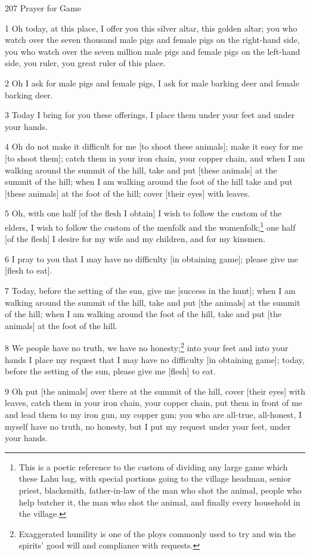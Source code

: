
207 Prayer for Game

1 Oh today, at this place, I offer you this silver altar, this golden altar; you
who watch over the seven thousand male pigs and female pigs on the right-hand side,
you who watch over the seven million male pigs and female pigs on the left-hand
side, you ruler, you great ruler of this place.

2 Oh I ask for male pigs and female pigs, I ask for male barking deer and female
barking deer.

3 Today I bring for you these offerings, I place them under your feet and under
your hands.

4 Oh do not make it difficult for me [to shoot these animals]; make it easy for
me [to shoot them]; catch them in your iron chain, your copper chain, and when
I am walking around the summit of the hill, take and put [these animals] at the
summit of the hill; when I am walking around the foot of the hill take and put
[these animals] at the foot of the hill; cover [their eyes] with leaves.

5 Oh, with one half [of the flesh I obtain] I wish to follow the custom of the
elders, I wish to follow the custom of the menfolk and the womenfolk;\footnote{This is a poetic reference to the custom of dividing any large game which these Lahu bag, with special portions going to the village headman, senior priest, blacksmith, father-in-law of the man who shot the animal, people who help butcher it, the man who shot the animal, and finally every household in the village.} one half
[of the flesh] I desire for my wife and my children, and for my kinsmen.

6 I pray to you that I may have no difficulty [in obtaining game]; please give
me [flesh to eat].

7 Today, before the setting of the sun, give me [success in the hunt]; when I am
walking around the summit of the hill, take and put [the animals] at the summit
of the hill; when I am walking around the foot of the hill, take and put [the animals]
at the foot of the hill.

8 We people have no truth, we have no honesty;\footnote{Exaggerated humility is one of the ploys commonly used to try and win the spirits' good will and compliance with requests.} into your feet and into your
hands I place my request that I may have no difficulty [in obtaining game]; today,
before the setting of the sun, please give me [flesh] to eat.

9 Oh put [the animals] over there at the summit of the hill, cover [their eyes]
with leaves, catch them in your iron chain, your copper chain, put them in front
of me and lead them to my iron gun, my copper gun; you who are all-true, all-honest,
I myself have no truth, no honesty, but I put my request under your feet, under
your hands.

